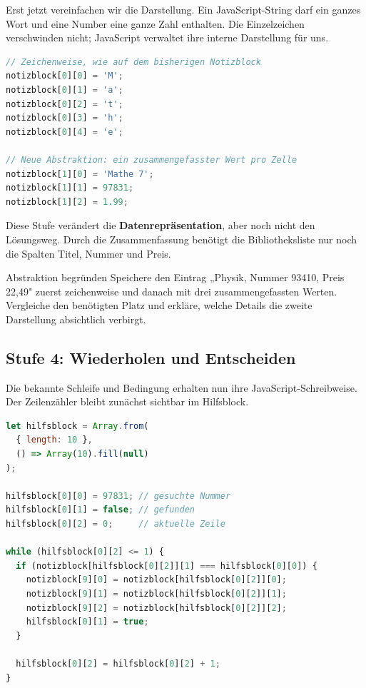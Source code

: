 \documentclass{article}
\begin{document}
Erst jetzt vereinfachen wir die Darstellung. Ein JavaScript-String darf ein ganzes Wort und eine Number eine ganze Zahl enthalten. Die Einzelzeichen verschwinden nicht; JavaScript verwaltet ihre interne Darstellung für uns.

\begin{lstlisting}[language=JavaScript]
// Zeichenweise, wie auf dem bisherigen Notizblock
notizblock[0][0] = 'M';
notizblock[0][1] = 'a';
notizblock[0][2] = 't';
notizblock[0][3] = 'h';
notizblock[0][4] = 'e';

// Neue Abstraktion: ein zusammengefasster Wert pro Zelle
notizblock[1][0] = 'Mathe 7';
notizblock[1][1] = 97831;
notizblock[1][2] = 1.99;
\end{lstlisting}

Diese Stufe verändert die \textbf{Datenrepräsentation}, aber noch nicht den Lösungsweg. Durch die Zusammenfassung benötigt die Bibliotheksliste nur noch die Spalten Titel, Nummer und Preis.

\begin{uebung}{Abstraktion begründen}
Speichere den Eintrag „Physik, Nummer 93410, Preis 22,49" zuerst zeichenweise und danach mit drei zusammengefassten Werten. Vergleiche den benötigten Platz und erkläre, welche Details die zweite Darstellung absichtlich verbirgt.
\end{uebung}

\subsection{Stufe 4: Wiederholen und Entscheiden}

Die bekannte Schleife und Bedingung erhalten nun ihre JavaScript-Schreibweise. Der Zeilenzähler bleibt zunächst sichtbar im Hilfsblock.

\begin{lstlisting}[language=JavaScript]
let hilfsblock = Array.from(
  { length: 10 },
  () => Array(10).fill(null)
);

hilfsblock[0][0] = 97831; // gesuchte Nummer
hilfsblock[0][1] = false; // gefunden
hilfsblock[0][2] = 0;     // aktuelle Zeile

while (hilfsblock[0][2] <= 1) {
  if (notizblock[hilfsblock[0][2]][1] === hilfsblock[0][0]) {
    notizblock[9][0] = notizblock[hilfsblock[0][2]][0];
    notizblock[9][1] = notizblock[hilfsblock[0][2]][1];
    notizblock[9][2] = notizblock[hilfsblock[0][2]][2];
    hilfsblock[0][1] = true;
  }

  hilfsblock[0][2] = hilfsblock[0][2] + 1;
}
\end{lstlisting}
\end{document}

